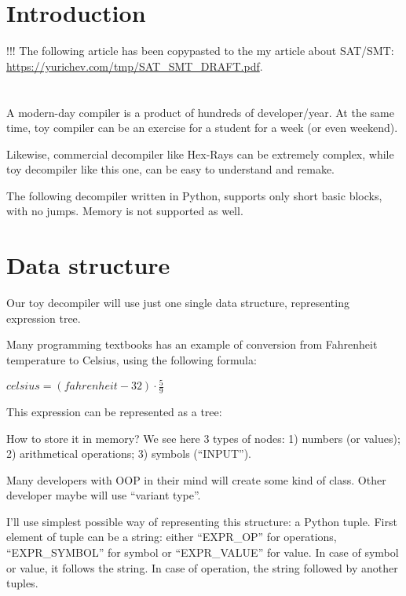 ﻿\documentclass[12pt]{article}
\author{\AUTHOR}
\title{\TITLE}
\date{April 2016 -- December 2016}
\begin{document}
\maketitle

\tableofcontents

\section{Introduction}

!!! The following article has been copypasted to the my article about SAT/SMT: \url{https://yurichev.com/tmp/SAT_SMT_DRAFT.pdf}.\\
\\
\\
A modern-day compiler is a product of hundreds of developer/year.
At the same time, toy compiler can be an exercise for a student for a week (or even weekend).

Likewise, commercial decompiler like Hex-Rays can be extremely complex,
while toy decompiler like this one, can be easy to understand and remake.

The following decompiler written in Python, supports only short basic blocks, with no jumps.
Memory is not supported as well.

\section{Data structure}

Our toy decompiler will use just one single data structure, representing expression tree.

Many programming textbooks has an example of conversion from Fahrenheit temperature to Celsius, using the following formula:

\begin{center}
{\large $celsius = (fahrenheit - 32) \cdot \frac{5}{9}$}
\end{center}

This expression can be represented as a tree:



How to store it in memory?
We see here 3 types of nodes: 1) numbers (or values); 2) arithmetical operations; 3) symbols (``INPUT'').

Many developers with \ac{OOP} in their mind will create some kind of class.
Other developer maybe will use ``variant type''.

I'll use simplest possible way of representing this structure: a Python tuple.
First element of tuple can be a string:
either ``EXPR\_OP'' for operations, ``EXPR\_SYMBOL'' for symbol or ``EXPR\_VALUE'' for value.
In case of symbol or value, it follows the string.
In case of operation, the string followed by another tuples.
\end{document}
